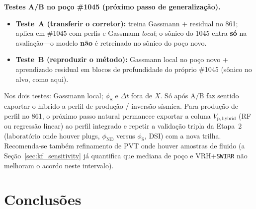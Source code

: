 \documentclass[11pt,a4paper]{article}
\numberwithin{equation}{section}
\newcommand{\phiND}{\ensuremath{\phi_{\mathrm{ND}}}}
\newcommand{\phiS}{\ensuremath{\phi_{\mathrm{S}}}}
\begin{document}
\textbf{Testes A/B no poço \#1045 (próximo passo de generalização).}
\begin{itemize}
  \item \textbf{Teste~A (transferir o corretor):}
        treina Gassmann $+$ residual no 861; aplica em \#1045 com
        perfis e Gassmann \emph{local}; o sônico do 1045 entra
        \textbf{só} na avaliação---o modelo \textbf{não} é retreinado
        no sônico do poço novo.
  \item \textbf{Teste~B (reproduzir o método):}
        Gassmann local no poço novo + aprendizado residual em blocos
        de profundidade do próprio \#1045 (sônico no alvo, como aqui).
\end{itemize}
Nos dois testes: Gassmann local; \phiS{} e $\Delta t$ fora de $X$.
Só após A/B faz sentido exportar o híbrido a perfil de produção /
inversão sísmica.
Para produção de perfil no 861, o próximo passo natural permanece exportar
a coluna $V_{\mathrm{p,hybrid}}$ (RF ou regressão linear) ao perfil
integrado e repetir a validação tripla da Etapa~2 (laboratório onde houver
plugs, \phiND{} versus \phiS{}, DSI) com a nova trilha.
Recomenda-se também refinamento de PVT onde houver amostras de fluido
(a Seção~\ref{sec:kf_sensitivity} já quantifica que mediana de poço e
VRH+\texttt{SWIRR} não melhoram o acordo neste intervalo).

\section{Conclusões}
\label{sec:conclusoes}
\end{document}
